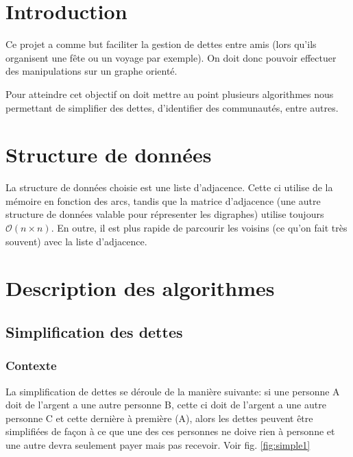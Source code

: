 \documentclass[11pt,a4paper]{article}
\begin{document}
  \pagestyle{empty}
\tableofcontents
\newpage %
\pagestyle{fancy}
\setcounter{page}{1}


\section{Introduction}

Ce projet a comme but faciliter la gestion de dettes entre amis (lors
qu'ils organisent une fête ou un voyage par exemple). On doit donc
pouvoir effectuer des manipulations sur un graphe orienté.\par Pour
atteindre cet objectif on doit mettre au point plusieurs algorithmes
nous permettant de simplifier des dettes, d'identifier des
communautés, entre autres.


\section{Structure de données}

La structure de données choisie est une liste d'adjacence. Cette ci
utilise de la mémoire en fonction des arcs, tandis que la matrice
d'adjacence (une autre structure de données valable pour répresenter
les digraphes) utilise toujours $\mathcal{O}(n\times n)$. En outre, il
est plus rapide de parcourir les voisins (ce qu'on fait très souvent)
avec la liste d'adjacence.


\section{Description des algorithmes}

\subsection{Simplification des dettes}
\subsubsection{Contexte}

La simplification de dettes se déroule de la manière suivante: si une
personne A doit de l'argent a une autre personne B, cette ci doit de
l'argent a une autre personne C et cette dernière à première (A),
alors les dettes peuvent être simplifiées de façon à ce que une des
ces personnes ne doive rien à personne et une autre devra seulement
payer mais pas recevoir. Voir fig. \ref{fig:simple1}
\end{document}
